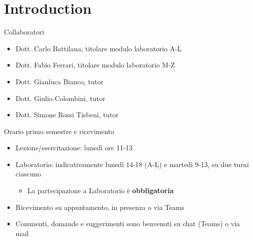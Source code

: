 
\section*{Introduction}

{
  \begin{frame}
    \sectionpage
  \end{frame}
}

\begin{frame}{Collaboratori}

  \begin{itemize}
  \item Dott. Carlo Battilana, titolare modulo laboratorio A-L
  \item Dott. Fabio Ferrari, titolare modulo laboratorio M-Z
  \item Dott. Gianluca Bianco, tutor
  \item Dott. Giulio Colombini, tutor
  \item Dott. Simone Rossi Tisbeni, tutor
  \end{itemize}

\end{frame}

\begin{frame}{Orario primo semestre e ricevimento}
  \begin{itemize}
  \item Lezione/esercitazione: lunedì ore 11-13
  \item Laboratorio: indicativamente lunedì 14-18 (A-L) e martedì 9-13, su due turni ciascuno
    \begin{itemize}
    \item La partecipazione a Laboratorio è \textbf{obbligatoria}
    \end{itemize}
  \item Ricevimento su appuntamento, in presenza o via Teams
  \item Commenti, domande e suggerimenti sono benvenuti su chat (Teams) o via mail
  \end{itemize}
\end{frame}

